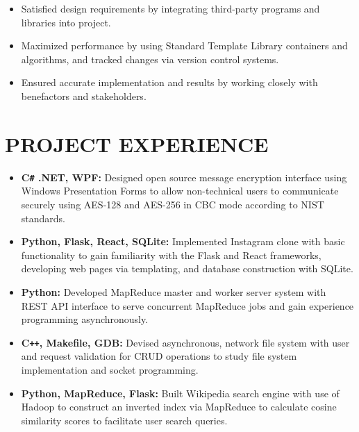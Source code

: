 \documentclass[overlapped]{res}
\begin{document}
\begin{resume}
\begin{itemize}
    \item Satisfied design requirements by integrating third-party programs 
    and libraries into project.
    
    \item Maximized performance by using 
    Standard Template Library containers and algorithms,
    and tracked changes via version control systems.

    \item Ensured accurate implementation and results by working closely
     with benefactors and stakeholders.
\end{itemize}

\section{PROJECT EXPERIENCE}

\begin{itemize}[label={}]  \itemsep -2pt %
    \item \textbf{C\texttt{\#} .NET, WPF:}
    Designed open source message encryption interface using
    Windows Presentation Forms to allow non-technical users
    to communicate securely using AES-128 and AES-256 in CBC mode
    according to NIST standards.
    \item \textbf{Python, Flask, React, SQLite:}
    Implemented Instagram clone with basic functionality 
    to gain familiarity with the Flask and React frameworks, 
    developing web pages via templating, 
    and database construction with SQLite.
    \item \textbf{Python:}
    Developed MapReduce master and worker server system 
    with REST API interface to serve concurrent MapReduce jobs
    and gain experience programming asynchronously.
    \item \textbf{C\texttt{++}, Makefile, GDB:} Devised asynchronous, 
    network file system with user and request
    validation for CRUD operations to study file system implementation
    and socket programming.
    \item \textbf{Python, MapReduce, Flask:}
    Built Wikipedia search engine with use of Hadoop 
    to construct an inverted index via MapReduce
    to calculate cosine similarity scores 
    to facilitate user search queries.
\end{itemize}


\end{resume}
\end{document}
